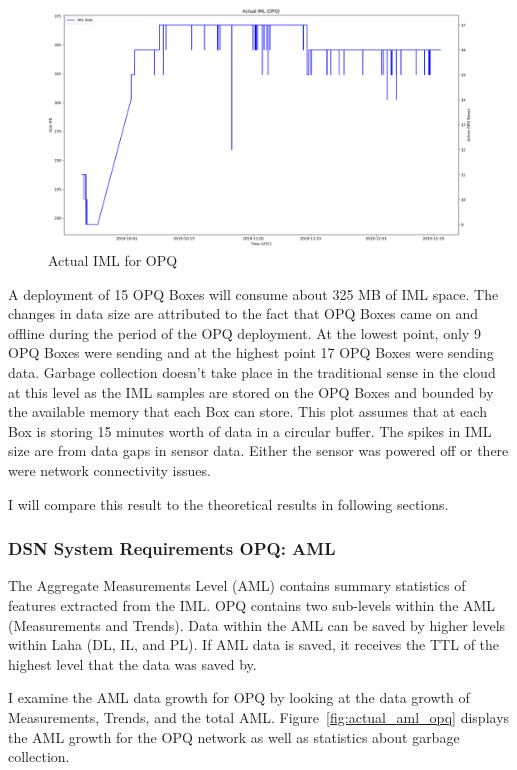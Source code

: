 \begin{figure}[H]
    \centering
    \includegraphics[width=\linewidth]{figures/actual_iml_opq.png}
    \caption{Actual IML for OPQ}
    \label{fig:actual_iml_opq}
\end{figure}

A deployment of 15 OPQ Boxes will consume about 325 MB of IML space. The changes in data size are attributed to the fact that OPQ Boxes came on and offline during the period of the OPQ deployment. At the lowest point, only 9 OPQ Boxes were sending and at the highest point 17 OPQ Boxes were sending data. Garbage collection doesn't take place in the traditional sense in the cloud at this level as the IML samples are stored on the OPQ Boxes and bounded by the available memory that each Box can store. This plot assumes that at each Box is storing 15 minutes worth of data in a circular buffer. The spikes in IML size are from data gaps in sensor data. Either the sensor was powered off or there were network connectivity issues.

I will compare this result to the theoretical results in following sections.

\subsubsection{DSN System Requirements OPQ: AML}

The Aggregate Measurements Level (AML) contains summary statistics of features extracted from the IML. OPQ contains two sub-levels within the AML (Measurements and Trends). Data within the AML can be saved by higher levels within Laha (DL, IL, and PL). If AML data is saved, it receives the TTL of the highest level that the data was saved by.

I examine the AML data growth for OPQ by looking at the data growth of Measurements, Trends, and the total AML. Figure~\ref{fig:actual_aml_opq} displays the AML growth for the OPQ network as well as statistics about garbage collection.

